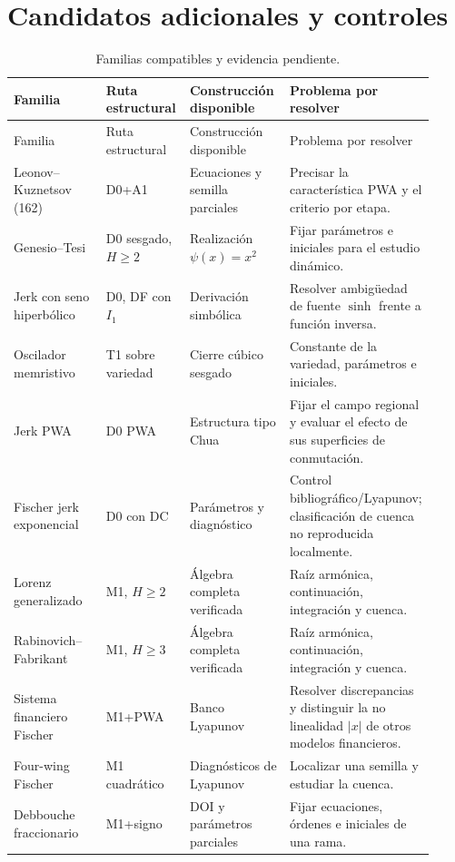 \section{Candidatos adicionales y controles}
\label{sec:candidate-queue}

\begin{longtable}{@{}L{0.23\linewidth}L{0.20\linewidth}L{0.24\linewidth}L{0.25\linewidth}@{}}
\caption{Familias compatibles y evidencia pendiente.}
\label{tab:candidate-portfolio}\\
\toprule
Familia & Ruta estructural & Construcción disponible & Problema por resolver\\
\midrule
\endfirsthead
\toprule
Familia & Ruta estructural & Construcción disponible & Problema por resolver\\
\midrule
\endhead
Leonov--Kuznetsov (162) & D0+A1 & Ecuaciones y semilla parciales &
Precisar la característica PWA y el criterio por etapa.\\
Genesio--Tesi & D0 sesgado, \(H\ge2\) & Realización
\(\psi(x)=x^2\) & Fijar parámetros e iniciales para el estudio dinámico.\\
Jerk con seno hiperbólico & D0, DF con \(I_1\) & Derivación simbólica &
Resolver ambigüedad de fuente \(\sinh\) frente a función inversa.\\
Oscilador memristivo & T1 sobre variedad & Cierre cúbico sesgado &
Constante de la variedad, parámetros e iniciales.\\
Jerk PWA & D0 PWA & Estructura tipo Chua & Fijar el campo regional y evaluar
el efecto de sus superficies de conmutación.\\
Fischer jerk exponencial & D0 con DC & Parámetros y diagnóstico &
Control bibliográfico/Lyapunov; clasificación de cuenca no reproducida
localmente.\\
Lorenz generalizado & M1, \(H\ge2\) & Álgebra completa verificada &
Raíz armónica, continuación, integración y cuenca.\\
Rabinovich--Fabrikant & M1, \(H\ge3\) & Álgebra completa verificada &
Raíz armónica, continuación, integración y cuenca.\\
Sistema financiero Fischer & M1+PWA & Banco Lyapunov & Resolver discrepancias
y distinguir la no linealidad \(|x|\) de otros modelos financieros.\\
Four-wing Fischer & M1 cuadrático & Diagnósticos de Lyapunov & Localizar una
semilla y estudiar la cuenca.\\
Debbouche fraccionario & M1+signo & DOI y parámetros parciales
\cite{debbouche2021} & Fijar ecuaciones, órdenes e iniciales de una rama.\\
\bottomrule
\end{longtable}

